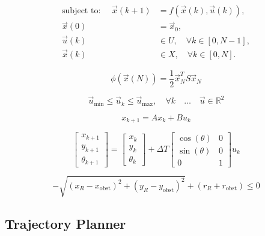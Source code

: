 \documentclass[conference]{IEEEtran}
\begin{document}
\begin{align}
\text{subject to: } \quad \vec{x}(k+1) &= f(\vec{x}(k), \vec{u}(k)), \\
\vec{x}(0) &= \vec{x}_0, \\
\vec{u}(k) &\in U, \quad \forall k \in [0, N-1], \\
\vec{x}(k) &\in X, \quad \forall k \in [0, N].
\end{align}


\begin{equation}
\label{eq:phi_definition}
\phi(\vec{x}(N)) = \frac{1}{2} \vec{x}_N^T S \vec{x}_N
\end{equation}

\begin{equation}
\label{eq:u_constraints}
\vec{u}_{\text{min}} \leq \vec{u}_k \leq \vec{u}_{\text{max}}, \quad \forall k \quad \text{…} \quad \vec{u} \in \mathbb{R}^2
\end{equation}

\begin{equation} \label{eq:1}
    x_{k+1} = Ax_k + Bu_k
\end{equation}


\begin{equation} \label{eq:discrete_state_space_equation_DDMR}
\begin{bmatrix}
    x_{k+1} \\
    y_{k+1} \\
    \theta_{k+1}
\end{bmatrix}
=
\begin{bmatrix}
    x_k \\
    y_k \\
    \theta_k
\end{bmatrix}
+ \Delta T
\begin{bmatrix}
    \cos(\theta) & 0 \\
    \sin(\theta) & 0 \\
    0 & 1
\end{bmatrix}
u_k
\end{equation}


\begin{equation}
\label{eq:collision_condition}
-\sqrt{(x_R - x_{\text{obst}})^2 + (y_R - y_{\text{obst}})^2} + (r_R + r_{\text{obst}}) \leq 0
\end{equation}









\subsection{Trajectory Planner}
\end{document}
